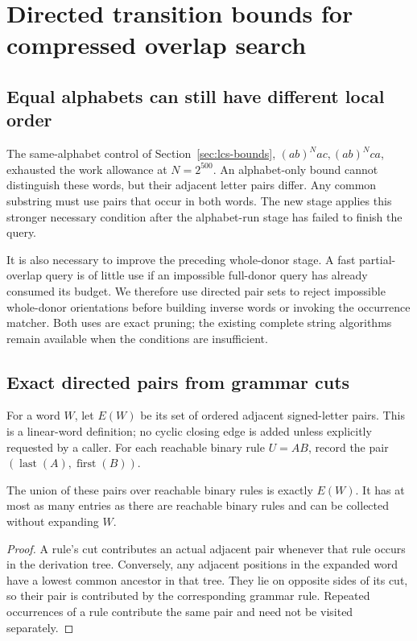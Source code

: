 \section{Directed transition bounds for compressed overlap search}
\label{sec:lcs-transitions}

\subsection{Equal alphabets can still have different local order}

The same-alphabet control of Section~\ref{sec:lcs-bounds},
$(ab)^Nac,(ab)^Nca$, exhausted the work allowance at $N=2^{500}$.
An alphabet-only bound cannot distinguish these words, but their adjacent
letter pairs differ. Any common substring must use pairs that occur in
both words. The new stage applies this stronger necessary condition after
the alphabet-run stage has failed to finish the query.

It is also necessary to improve the preceding whole-donor stage. A fast
partial-overlap query is of little use if an impossible full-donor query
has already consumed its budget. We therefore use directed pair sets to
reject impossible whole-donor orientations before building inverse words
or invoking the occurrence matcher. Both uses are exact pruning; the
existing complete string algorithms remain available when the conditions
are insufficient.

\subsection{Exact directed pairs from grammar cuts}

For a word $W$, let $E(W)$ be its set of ordered adjacent signed-letter
pairs. This is a linear-word definition; no cyclic closing edge is added
unless explicitly requested by a caller. For each reachable binary rule
$U=AB$, record the pair
$(\operatorname{last}(A),\operatorname{first}(B))$.

\begin{lemma}
The union of these pairs over reachable binary rules is exactly $E(W)$.
It has at most as many entries as there are reachable binary rules and
can be collected without expanding $W$.
\end{lemma}
\begin{proof}
A rule's cut contributes an actual adjacent pair whenever that rule occurs
in the derivation tree. Conversely, any adjacent positions in the expanded
word have a lowest common ancestor in that tree. They lie on opposite sides
of its cut, so their pair is contributed by the corresponding grammar rule.
Repeated occurrences of a rule contribute the same pair and need not be
visited separately.
\end{proof}

